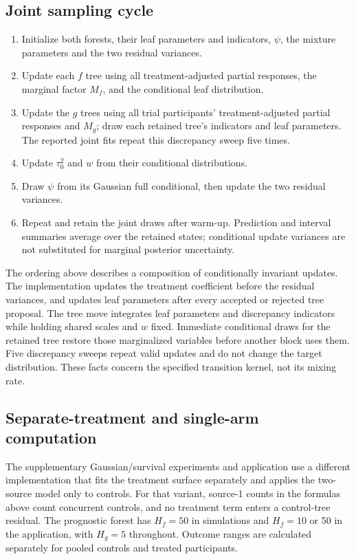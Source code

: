 \subsection{Joint sampling cycle}\label{sec:A.6}
\begin{enumerate}
\item Initialize both forests, their leaf parameters and indicators, $\psi$, the mixture parameters and the two residual variances.
\item Update each $f$ tree using all treatment-adjusted partial responses, the marginal factor $M_f$, and the conditional leaf distribution.
\item Update the $g$ trees using all trial participants' treatment-adjusted partial responses and $M_g$; draw each retained tree's indicators and leaf parameters. The reported joint fits repeat this discrepancy sweep five times.
\item Update $\tau_0^2$ and $w$ from their conditional distributions.
\item Draw $\psi$ from its Gaussian full conditional, then update the two residual variances.
\item Repeat and retain the joint draws after warm-up. Prediction and interval summaries average over the retained states; conditional update variances are not substituted for marginal posterior uncertainty.
\end{enumerate}
The ordering above describes a composition of conditionally invariant updates. The implementation updates the treatment coefficient before the residual variances, and updates leaf parameters after every accepted or rejected tree proposal. The tree move integrates leaf parameters and discrepancy indicators while holding shared scales and $w$ fixed. Immediate conditional draws for the retained tree restore those marginalized variables before another block uses them. Five discrepancy sweeps repeat valid updates and do not change the target distribution. These facts concern the specified transition kernel, not its mixing rate.

\subsection{Separate-treatment and single-arm computation}\label{sec:A.7}
The supplementary Gaussian/survival experiments and application use a different implementation that fits the treatment surface separately and applies the two-source model only to controls. For that variant, source-1 counts in the formulas above count concurrent controls, and no treatment term enters a control-tree residual. The prognostic forest has $H_f=50$ in simulations and $H_f=10$ or 50 in the application, with $H_g=5$ throughout. Outcome ranges are calculated separately for pooled controls and treated participants.

